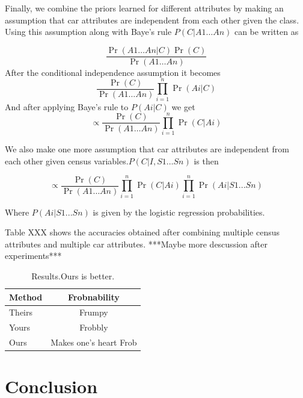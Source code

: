 \documentclass[10pt,twocolumn,letterpaper]{article}
\begin{document}
Finally, we combine the priors learned for different attributes by making an assumption that car attributes are independent from each other given the class. Using this assumption along with Baye's rule \(P(C|A1 \ldots An)\) can be written as 

\begin{equation}
\frac{\Pr(A1\ldots An|C)\Pr(C)}{\Pr(A1\ldots An)}
\end{equation}
After the conditional independence assumption it becomes
\begin{equation}
\frac{\Pr(C)}{\Pr(A1\ldots An)}\prod\limits_{i=1}^n \Pr(Ai|C)
\end{equation}
And after applying Baye's rule to \(P(Ai|C)\) we get 
\begin{equation}
\propto \frac{\Pr(C)}{\Pr(A1\ldots An)}\prod\limits_{i=1}^n \Pr(C|Ai)
\end{equation}

We also make one more assumption that car attributes are independent from each other given census variables.\(P(C|I,S1 \ldots Sn)\) is then  

\begin{equation}
\propto \frac{\Pr(C)}{\Pr(A1\ldots An)}\prod\limits_{i=1}^n \Pr(C|Ai) \prod\limits_{i=1}^n \Pr(Ai|S1...Sn)
\end{equation}

Where \(P(Ai|S1...Sn)\) is given by the logistic regression probabilities.

Table XXX shows the accuracies obtained after combining multiple census attributes and multiple car attributes. ***Maybe more descussion after experiments***
\begin{table}
\begin{center}
\begin{tabular}{|l|c|}
\hline
Method & Frobnability \\
\hline\hline
Theirs & Frumpy \\
Yours & Frobbly \\
Ours & Makes one's heart Frob\\
\hline
\end{tabular}
\end{center}
\caption{Results.Ours is better.}
\label{table:prior-acc}
\end{table}

\section{Conclusion}
{\small


}
\end{document}
